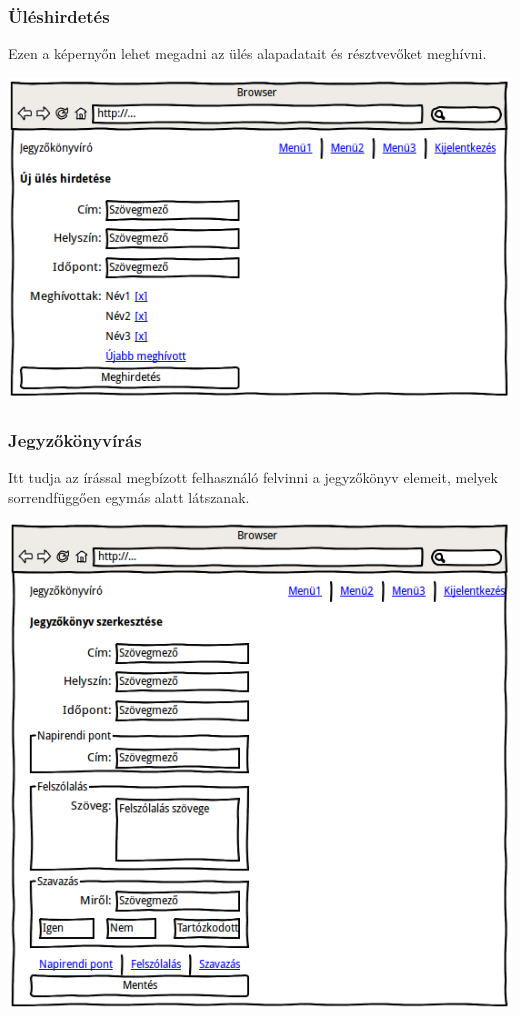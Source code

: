\documentclass[a4paper,12pt,oneside]{report}
\begin{document}
\subsubsection{Üléshirdetés}

Ezen a képernyőn lehet megadni az ülés alapadatait és résztvevőket meghívni.

\includegraphics[width=\textwidth]{wireframe-uleshirdetes}

\subsubsection{Jegyzőkönyvírás}

Itt tudja az írással megbízott felhasználó felvinni a jegyzőkönyv elemeit, melyek sorrendfüggően egymás alatt látszanak.

\includegraphics[width=\textwidth]{wireframe-jegyzokonyvszerkesztes}
\end{document}
